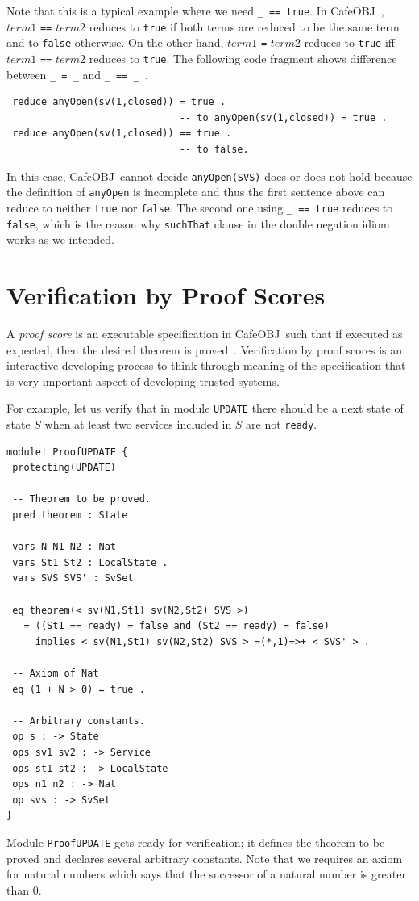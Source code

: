 \documentclass[12pt]{report}
\newcommand{\stt}[1]{{\small{\tt {#1}}}}
\newcommand{\cafeobj}{{\sf CafeOBJ}~}
\begin{document}
Note that this is a typical example where we need \stt{\_ == true}. In
\cafeobj, $term1$ {\tt ==} $term2$ reduces to {\tt true} if both terms
are reduced to be the same term and to {\tt false} otherwise. On the
other hand, $term1$ {\tt =} $term2$ reduces to {\tt true} iff $term1$
{\tt ==} $term2$ reduces to {\tt true}. The following code fragment
shows difference between \stt{\_ = \_} and \stt{\_ == \_ }.
\begin{verbatim}
 reduce anyOpen(sv(1,closed)) = true .
                              -- to anyOpen(sv(1,closed)) = true .
 reduce anyOpen(sv(1,closed)) == true . 
                              -- to false.
\end{verbatim}
In this case, \cafeobj cannot decide \stt{anyOpen(SVS)} does or does
not hold because the definition of {\tt anyOpen} is incomplete and
thus the first sentence above can reduce to neither {\tt true} nor
{\tt false}.  The second one using \stt{\_ == true} reduces to
{\tt false}, which is the reason why {\tt suchThat} clause in the
double negation idiom works as we intended.

\section{Verification by Proof Scores}
\label{sec:pscore}
A {\it proof score} is an executable specification in \cafeobj such
that if executed as expected, then the desired theorem is
proved~\cite{FutatsugiGO12pps}. Verification by proof scores is an
interactive developing process to think through meaning of the
specification that is very important aspect of developing trusted
systems.

For example, let us verify that in module {\tt UPDATE} there should be
a next state of state $S$ when at least two services included in $S$
are not {\tt ready}.
\begin{verbatim}
module! ProofUPDATE {
 protecting(UPDATE)

 -- Theorem to be proved.
 pred theorem : State

 vars N N1 N2 : Nat
 vars St1 St2 : LocalState .
 vars SVS SVS' : SvSet

 eq theorem(< sv(N1,St1) sv(N2,St2) SVS >)
   = ((St1 == ready) = false and (St2 == ready) = false)
     implies < sv(N1,St1) sv(N2,St2) SVS > =(*,1)=>+ < SVS' > .

 -- Axiom of Nat
 eq (1 + N > 0) = true .

 -- Arbitrary constants.
 op s : -> State
 ops sv1 sv2 : -> Service
 ops st1 st2 : -> LocalState
 ops n1 n2 : -> Nat
 op svs : -> SvSet
}
\end{verbatim}
Module {\tt ProofUPDATE} gets ready for verification; it defines the
theorem to be proved and declares several arbitrary constants.  Note
that we requires an axiom for natural numbers which says that the
successor of a natural number is greater than 0.
\end{document}
